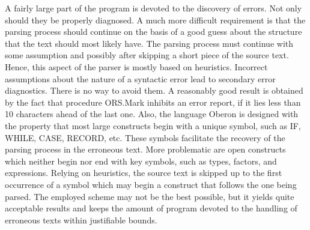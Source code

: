 A fairly large part of the program is devoted to the discovery of errors. Not only should they be
properly diagnosed. A much more difficult requirement is that the parsing process should continue
on the basis of a good guess about the structure that the text should most likely have. The parsing
process must continue with some assumption and possibly after skipping a short piece of the
source text. Hence, this aspect of the parser is mostly based on heuristics. Incorrect assumptions
about the nature of a syntactic error lead to secondary error diagnostics. There is no way to avoid
them. A reasonably good result is obtained by the fact that procedure ORS.Mark inhibits an error
report, if it lies less than 10 characters ahead of the last one. Also, the language Oberon is
designed with the property that most large constructs begin with a unique symbol, such as IF,
WHILE, CASE, RECORD, etc. These symbols facilitate the recovery of the parsing process in the
erroneous text. More problematic are open constructs which neither begin nor end with key
symbols, such as types, factors, and expressions. Relying on heuristics, the source text is skipped
up to the first occurrence of a symbol which may begin a construct that follows the one being
parsed. The employed scheme may not be the best possible, but it yields quite acceptable results
and keeps the amount of program devoted to the handling of erroneous texts within justifiable
bounds.

